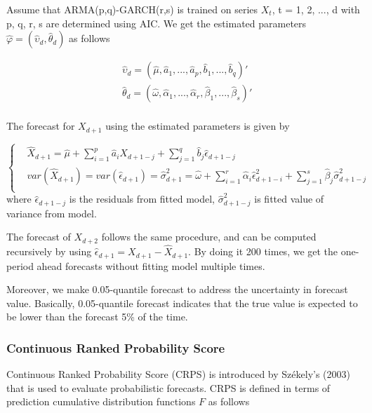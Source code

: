 \documentclass[12pt,a4paper]{article}
\numberwithin{equation}{section}
\begin{document}
Assume that ARMA(p,q)-GARCH(r,s) is trained on series $X_t$, t = 1, 2, ..., d with p, q, r, s are determined using AIC. We get the estimated parameters $\hat{\varphi} = (\hat{\upsilon}_d, \hat{\theta}_d)$ as follows

\begin{align*}
& \hat{\upsilon}_d = (\hat{\mu}, \hat{a}_1, ... , \hat{a}_p, \hat{b}_1, ..., \hat{b}_q)' \\
& \hat{\theta}_d = (\hat{\omega}, \hat{\alpha}_1, ..., \hat{\alpha}_r, \hat{\beta}_1, ..., \hat{\beta}_s)'\\
\end{align*}

The forecast for $X_{d+1}$ using the estimated parameters is given by

\begin{equation*}
\begin{cases}

& \hat{X}_{d+1} = \hat{\mu} + \sum_{i=1}^{p} \hat{a}_i X_{d+1-j}  + \sum_{j=1}^{q} \hat{b}_j \hat{\epsilon}_{d+1-j}\\
& var(\hat{X}_{d+1}) = var(\hat{\epsilon}_{d+1}) = \hat{\sigma}_{d+1}^2 = \hat{\omega} + \sum_{i=1}^{r} \hat{\alpha}_i \hat{\epsilon}_{d+1-i}^2 + \sum_{j=1}^{s} \hat{\beta}_j \hat{\sigma}_{d+1-j}^2 \\
\end{cases}
\end{equation*}
where $\hat{\epsilon}_{d+1-j}$ is the residuals from fitted model, $\hat{\sigma}_{d+1-j}^2$ is fitted value of variance from model.
 
 The forecast of $X_{d+2}$ follows the same procedure, and can be computed recursively by using $\hat{\epsilon}_{d+1} = X_{d+1} - \hat{X}_{d+1}$. By doing it 200 times, we get the one-period ahead forecasts without fitting model multiple times.
 
 Moreover, we make 0.05-quantile forecast to address the uncertainty in forecast value. Basically, 0.05-quantile forecast indicates that the true value is expected to be lower than the forecast 5\% of the time. 
 
 \subsubsection{Continuous Ranked Probability Score}
 Continuous Ranked Probability Score (CRPS) is introduced by Székely’s (2003) that is used to evaluate probabilistic forecasts. CRPS is defined in terms of prediction cumulative distribution functions  $F$ as follows
 
\end{document}
